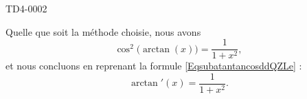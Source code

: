 \begin{corrige}{TD4-0002}
\begin{enumerate}
\begin{description}
            \end{description}
            
            Quelle que soit la méthode choisie, nous avons
            \begin{equation}
                \cos^2\big( \arctan(x) \big)=\frac{1}{ 1+x^2 },
            \end{equation}
            et nous concluons en reprenant la formule \eqref{EqsubatantancosddQZLe} :
            \begin{equation}
                \arctan'(x)=\frac{1}{ 1+x^2 }.
            \end{equation}
			
	\end{enumerate}
	

\end{corrige}

